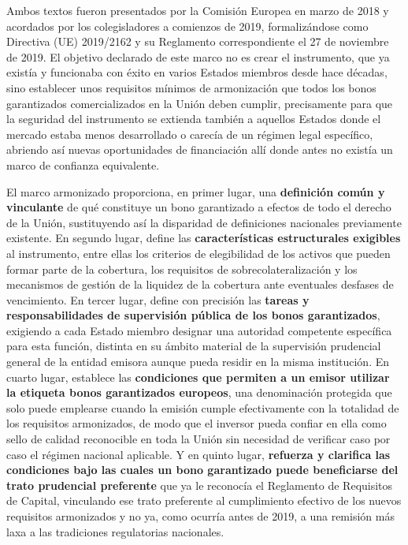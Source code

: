 \documentclass[10pt,a4paper]{article}
\begin{document}
{Ambos textos fueron presentados por la Comisión Europea en marzo de 2018 y acordados por los colegisladores a comienzos de 2019, formalizándose como Directiva (UE) 2019/2162 y su Reglamento correspondiente el 27 de noviembre de 2019. El objetivo declarado de este marco no es crear el instrumento, que ya existía y funcionaba con éxito en varios Estados miembros desde hace décadas, sino establecer unos requisitos mínimos de armonización que todos los bonos garantizados comercializados en la Unión deben cumplir, precisamente para que la seguridad del instrumento se extienda también a aquellos Estados donde el mercado estaba menos desarrollado o carecía de un régimen legal específico, abriendo así nuevas oportunidades de financiación allí donde antes no existía un marco de confianza equivalente.

El marco armonizado proporciona, en primer lugar, una \textbf{definición común y vinculante} de qué constituye un bono garantizado a efectos de todo el derecho de la Unión, sustituyendo así la disparidad de definiciones nacionales previamente existente. En segundo lugar, define las \textbf{características estructurales exigibles} al instrumento, entre ellas los criterios de elegibilidad de los activos que pueden formar parte de la cobertura, los requisitos de sobrecolateralización y los mecanismos de gestión de la liquidez de la cobertura ante eventuales desfases de vencimiento. En tercer lugar, define con precisión las \textbf{tareas y responsabilidades de supervisión pública de los bonos garantizados}, exigiendo a cada Estado miembro designar una autoridad competente específica para esta función, distinta en su ámbito material de la supervisión prudencial general de la entidad emisora aunque pueda residir en la misma institución. En cuarto lugar, establece las \textbf{condiciones que permiten a un emisor utilizar la etiqueta bonos garantizados europeos}, una denominación protegida que solo puede emplearse cuando la emisión cumple efectivamente con la totalidad de los requisitos armonizados, de modo que el inversor pueda confiar en ella como sello de calidad reconocible en toda la Unión sin necesidad de verificar caso por caso el régimen nacional aplicable. Y en quinto lugar, \textbf{refuerza y clarifica las condiciones bajo las cuales un bono garantizado puede beneficiarse del trato prudencial preferente} que ya le reconocía el Reglamento de Requisitos de Capital, vinculando ese trato preferente al cumplimiento efectivo de los nuevos requisitos armonizados y no ya, como ocurría antes de 2019, a una remisión más laxa a las tradiciones regulatorias nacionales.

}
\end{document}
